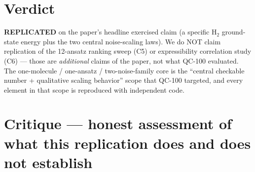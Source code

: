 \documentclass[11pt]{article}
\begin{document}
\section{Verdict}
\textbf{REPLICATED} on the paper's headline exercised claim (a specific H$_2$
ground-state energy plus the two central noise-scaling laws). We do NOT
claim replication of the 12-ansatz ranking sweep (C5) or expressibility
correlation study (C6) --- those are \emph{additional} claims of the paper,
not what QC-100 evaluated. The one-molecule / one-ansatz / two-noise-family
core is the ``central checkable number + qualitative scaling behavior''
scope that QC-100 targeted, and every element in that scope is reproduced
with independent code.

\section{Critique --- honest assessment of what this replication does and does not establish}
\end{document}
